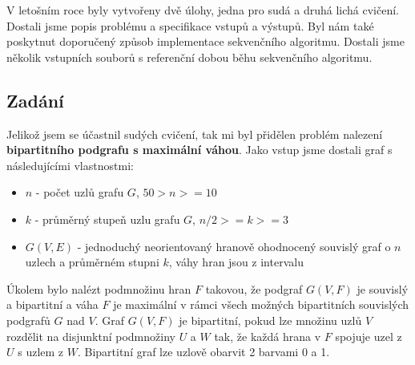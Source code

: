 V letošním roce byly vytvořeny dvě úlohy, jedna pro sudá a druhá lichá cvičení.
Dostali jsme popis problému a specifikace vstupů a výstupů.
Byl nám také poskytnut doporučený způsob implementace sekvenčního algoritmu.
Dostali jsme několik vstupních souborů s referenční dobou běhu sekvenčního algoritmu.

\subsection{Zadání}
Jelikož jsem se účastnil sudých cvičení, tak mi byl přidělen problém nalezení \textbf{bipartitního podgrafu s maximální váhou}. Jako vstup jsme dostali graf s následujícími vlastnostmi:

\begin{itemize}
    \item \(n\) - počet uzlů grafu \(G\), \(50 > n >= 10\)
    \item \(k\) - průměrný stupeň uzlu grafu \(G\), \(n/2 >= k >= 3\)
    \item \(G(V,E)\) - jednoduchý neorientovaný hranově ohodnocený souvislý graf o \(n\) uzlech a průměrném stupni \(k\), váhy hran jsou z intervalu \(<80,120>\)
\end{itemize}

Úkolem bylo nalézt podmnožinu hran \(F\) takovou, že podgraf \(G(V,F)\) je souvislý a bipartitní a váha \(F\) je maximální v rámci všech možných bipartitních souvislých podgrafů \(G\) nad \(V\).
Graf \(G(V,F)\) je bipartitní, pokud lze množinu uzlů \(V\) rozdělit na disjunktní podmnožiny \(U\) a \(W\) tak, že každá hrana v \(F\) spojuje uzel z \(U\) s uzlem z \(W\).
Bipartitní graf lze uzlově obarvit 2 barvami 0 a 1.